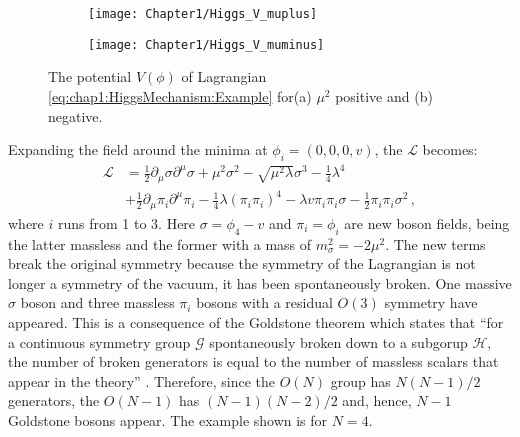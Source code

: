 \begin{figure}
\centering
\begin{subfigure}{.5\textwidth}
  \centering
  \texttt{[image: Chapter1/Higgs\_V\_muplus]}
  \caption{}
  \label{fig:Chap1:SM:HiggsMechanism:PotentialExample:Positive}
\end{subfigure}%
\begin{subfigure}{.5\textwidth}
  \centering
  \texttt{[image: Chapter1/Higgs\_V\_muminus]}
  \caption{}
  \label{fig:Chap1:SM:HiggsMechanism:PotentialExample:Negative}
\end{subfigure}
\caption{The potential $V(\phi)$ of Lagrangian \ref{eq:chap1:HiggsMechanism:Example} for(a) $\mu^{2}$ positive and (b) negative.}  
\label{fig:Chap1:SM:HiggsMechanism:PotentialExample}
\end{figure}
Expanding the field around the minima at $\phi_{i} =(0,0,0,v)$, the $\mathcal{L}$ becomes:
\begin{equation}
\begin{split}
	\mathcal{L} 	&=  \frac{1}{2}\partial_{\mu}\sigma\partial^{\mu}\sigma  + \mu^{2}\sigma^{2} -\sqrt{\mu^{2}\lambda}\sigma^{3}   -\frac{1}{4}\lambda^{4} \\
				& + \frac{1}{2}\partial_{\mu}\pi_{i}\partial^{\mu}\pi_{i} -\frac{1}{4}\lambda (\pi_{i}\pi_{i})^{4} - \lambda v \pi_{i}\pi_{i}\sigma - \frac{1}{2}\pi_{i}\pi_{i}\sigma^{2} \, ,
\end{split}
\end{equation}
where $i$ runs from 1 to 3. Here $\sigma = \phi_{4}-v$ and $\pi_{i} = \phi_{i}$ are new boson fields, being the latter massless and the former with a mass of $m_{\sigma}^2 = -2\mu^{2}$.
The new terms break the original symmetry because the symmetry of the Lagrangian is not longer a symmetry of the vacuum, it has been spontaneously broken.
One massive $\sigma$ boson and three massless $\pi_{i}$ bosons with a residual $O(3)$ symmetry have appeared. This is a consequence of the Goldstone theorem which states that 
``for a continuous symmetry group $\mathcal{G}$ spontaneously broken down to a subgorup $\mathcal{H}$, the number of broken generators is equal to the number of massless scalars 
that appear in the theory'' \cite{Goldstone:1962es}. Therefore, since the $O(N)$ group has $N(N-1)/2$ generators, the $O(N-1)$ has $(N-1)(N-2)/2$ and, hence, $N-1$ Goldstone bosons
appear. The example shown is for $N=4$.

